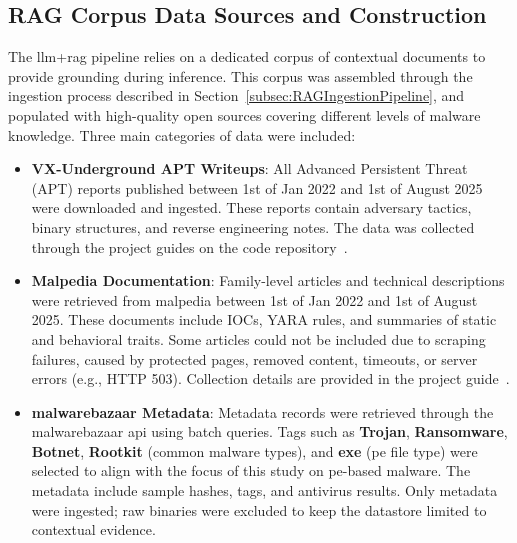 \subsection{RAG Corpus Data Sources and Construction}\label{subsec:RAGCorpusConstruction}
The \gls{llm}+\gls{rag} pipeline relies on a dedicated corpus of contextual documents to provide
grounding during inference. This corpus was assembled through the ingestion process described in
Section~\ref{subsec:RAGIngestionPipeline}, and populated with high-quality open sources covering
different levels of malware knowledge. Three main categories of data were included:

\begin{itemize}
      \item \textbf{VX-Underground APT Writeups}: All Advanced Persistent Threat (APT) reports
            published between 1st of Jan 2022 and 1st of August 2025 were downloaded and ingested. These reports
            contain adversary tactics, binary structures, and reverse engineering notes. The data
            was collected through the project guides on the code repository~\cite{rexisDataSourcingVXU,rexisIngestVXU}.

      \item \textbf{Malpedia Documentation}\cite{plohmann2017malpedia}: Family-level articles and
            technical descriptions were retrieved from \gls{malpedia} between 1st of Jan 2022 and 1st of August 2025.
            These documents include IOCs, YARA rules, and summaries of static and behavioral
            traits. Some articles could not be included due to scraping failures, caused by
            protected pages, removed content, timeouts, or server errors (e.g., HTTP 503). Collection
            details are provided in the project guide~\cite{rexisDataSourcingMalpedia}.

      \item \textbf{\gls{malwarebazaar} Metadata}: Metadata records were retrieved through the
            \gls{malwarebazaar} \gls{api} using batch queries. Tags such as \textbf{Trojan},
            \textbf{Ransomware}, \textbf{Botnet}, \textbf{Rootkit} (common malware types), and
            \textbf{exe} (\gls{pe} file type) were selected to align with the focus of this study on
            \gls{pe}-based malware. The metadata include sample hashes, tags, and antivirus
            results. Only metadata were ingested; raw binaries were excluded to keep the datastore
            limited to contextual evidence.
\end{itemize}

